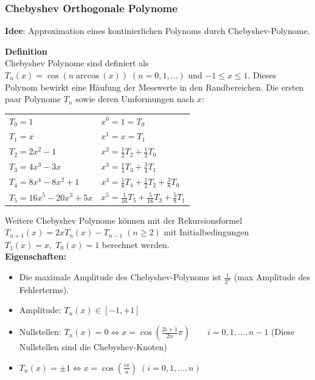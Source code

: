 \newpage
\subsubsection{Chebyshev Orthogonale Polynome}
\textbf{Idee}: Approximation eines kontinierlichen Polynoms durch Chebyshev-Polynome.

\textbf{Definition}\\
Chebyshev Polynome sind definiert als $T_n(x) = \cos(n \arccos(x))\;(n = 0,1,\ldots)$ und $-1 \leq x \leq 1$. Dieses 
Polynom bewirkt eine Häufung der Messwerte in den Randbereichen. Die
ersten paar Polynome $T_n$ sowie deren Umformungen nach $x$:\\
\begin{tabular}{ll}
  $T_0 = 1$ & $x^0 = 1 = T_0$ \\
  $T_1 = x$ & $x^1 = x = T_1$ \\
  $T_2 = 2x^2 -1$ & $x^2 = \frac12 T_2 + \frac12 T_0$ \\
  $T_3 = 4x^3 - 3x$ & $x^3 = \frac14 T_3 + \frac34 T_1$\\
  $T_4 = 8x^4 -8x^2 + 1$ & $x^4 = \frac18 T_4 + \frac12 T_2 + \frac38 T_0$\\
  $T_5 = 16x^5 - 20x^3 + 5x$ & $x^5 = \frac{1}{16} T_5 + \frac{5}{16} T_3 + \frac58 T_1$\\
\end{tabular}

Weitere Chebyshev Polynome können mit der Rekursionsformel $T_{n+1}(x) = 2x T_n(x)-T_{n-1}\;(n\geq2)$
mit Initialbedingungen $T_1(x)=x,\;T_0(x)=1$ berechnet werden.\\

\textbf{Eigenschaften: }
\begin{itemize}
  \item Die maximale Amplitude des Chebyshev-Polynoms ist $\frac{1}{2^n}$ (max Amplitude des Fehlerterms).
  \item Amplitude: $T_n(x) \in [-1,+1]$
  \item Nullstellen: $T_n(x)=0 \Leftrightarrow x=\cos(\frac{2i+1}{2n}\pi)\qquad i=0,1,\ldots,n-1$ (Diese Nullstellen sind die Chebyshev-Knoten)
  \item $T_n(x)= \pm 1 \Leftrightarrow x=\cos(\frac{i\pi}{n}) \; (i=0,1,\ldots,n)$
\end{itemize}

